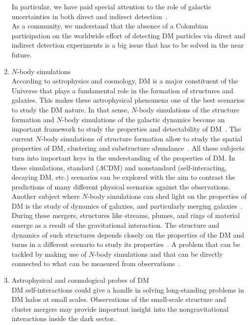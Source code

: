 \documentclass[a4paper,11pt]{article}
\begin{document}
\begin{enumerate}
In particular, we have paid special attention to the role of galactic uncertainties in both direct and indirect detection~\cite{Bernal:2014mmt, Bernal:2016guq, Benito:2016kyp}.\\
As a community, we understand that the absence of a Colombian participation on the worldwide effort of detecting DM particles via direct and indirect detection experiments is a big issue that has to be solved in the near future.
%
\item
$N$-body simulations\\ 
According to astrophysics and cosmology, DM is a major constituent of the Universe that plays a fundamental role in the formation of structures and galaxies. This makes these astrophysical phenomena one of the best scenarios to study the DM nature. In that sense, $N$-body simulations of the structure formation and $N$-body simulations of the galactic dynamics become an important framework to study the properties and detectability of DM~\cite{Munoz-Cuartas2011, Maccio2013}.
The current $N$-body simulations of structure formation allow to study the spatial properties of DM, clustering and substructure abundance~\cite{Munoz-Cuartas2011b, Munoz-Cuartas2012}. All these subjects turn into important keys in the understanding of the properties of DM. In these simulations, standard ($\Lambda$CDM) and nonstandard (self-interacting, decaying DM, etc.) scenarios can be explored with the aim to contrast the predictions of many different physical scenarios against the observations.
Another subject where $N$-body simulations can shed light on the properties of DM is the study of dynamics of galaxies, and particularly merging galaxies~\cite{Norena_etal2019, Quiroga2020}. During these mergers, structures like streams, plumes, and rings of material emerge as a result of the gravitational interaction. The structure and dynamics of such structures depends closely on the properties of the DM and turns in a different scenario to study its properties~\cite{Quiroga2020}. A problem that can be tackled by making use of $N$-body simulations and that can be directly connected to what can be measured from observations~\cite{Bernal:2014mmt, Bernal:2016guq}.  
%
\item
Astrophysical and cosmological probes of DM\\
DM self-interactions could give a handle in solving long-standing problems in DM halos at small scales. Observations of the small-scale structure and cluster mergers may provide important insight into the nongravitational interactions inside the dark sector.

\end{enumerate}
\end{document}
